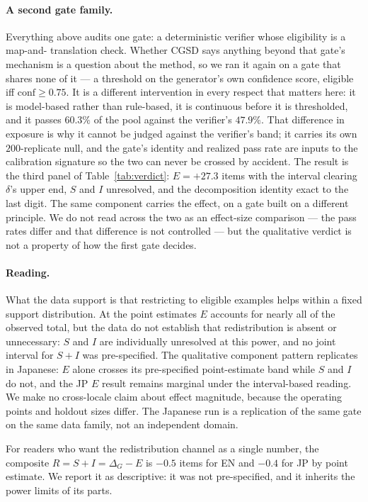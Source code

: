 \documentclass[10pt,twocolumn]{article}
\begin{document}
\paragraph{A second gate family.}
Everything above audits one gate: a deterministic verifier whose eligibility is a map-and-\allowbreak
translation check. Whether CGSD says anything beyond that gate's mechanism is a question about the
method, so we ran it again on a gate that shares none of it --- a threshold on the generator's own
confidence score, eligible iff $\mathrm{conf}\ge0.75$. It is a different intervention in every
respect that matters here: it is model-based rather than rule-based, it is continuous before it is
thresholded, and it passes $60.3\%$ of the pool against the verifier's $47.9\%$. That difference in
exposure is why it cannot be judged against the verifier's band; it carries its own $200$-replicate
null, and the gate's identity and realized pass rate are inputs to the calibration signature so the
two can never be crossed by accident. The result is the third panel of Table~\ref{tab:verdict}:
$E=+27.3$ items with the interval clearing $\delta$'s upper end, $S$ and $I$ unresolved, and the
decomposition identity exact to the last digit. The same component carries the effect, on a gate
built on a different principle. We do not read across the two as an effect-size comparison ---
the pass rates differ and that difference is not controlled --- but the qualitative verdict is not
a property of how the first gate decides.

\paragraph{Reading.}
What the data support is that restricting to eligible examples helps within a fixed support
distribution. At the point estimates $E$ accounts for nearly all of the observed total, but the
data do not establish that redistribution is absent or unnecessary: $S$ and $I$ are individually
unresolved at this power, and no joint interval for $S+I$ was pre-specified. The qualitative component pattern replicates in Japanese:
$E$ alone crosses its pre-specified point-estimate band while $S$ and $I$ do not, and the JP $E$
result remains marginal under the interval-based reading. We make no cross-locale claim about effect
magnitude, because the operating points and holdout sizes differ. The Japanese run is a
replication of the same gate on the same data family, not an independent domain.

For readers who want the redistribution channel as a single number, the composite
$R = S+I = \Delta_G-E$ is $-0.5$ items for EN and $-0.4$ for JP by point estimate. We report it
as descriptive: it was not pre-specified, and it inherits the power limits of its parts.
\end{document}
